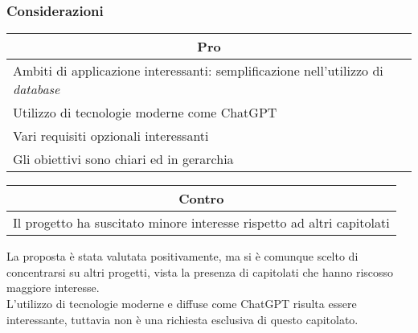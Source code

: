\subsubsection{Considerazioni}
\begin{minipage}[t]{0.45\linewidth}
    \vspace{0pt}
    {\renewcommand{\arraystretch}{1.5}
    \begin{tabular}{p{1\linewidth}}
        \multicolumn{1}{c}{\textbf{Pro}} \\
        \midrule
        Ambiti di applicazione interessanti: semplificazione nell'utilizzo di \textit{database}\\
        Utilizzo di tecnologie moderne come ChatGPT \\
        Vari requisiti opzionali interessanti \\
        Gli obiettivi sono chiari ed in gerarchia \\
        \hline
    \end{tabular}
    }
\end{minipage}
\hspace{0.05\linewidth}
\begin{minipage}[t]{0.45\linewidth}
    \vspace{0pt}
    {\renewcommand{\arraystretch}{1.5}
    \begin{tabular}{p{1\linewidth}}
        \multicolumn{1}{c}{\textbf{Contro}} \\
        \midrule
        Il progetto ha suscitato minore interesse rispetto ad altri capitolati \\
        \hline
    \end{tabular}
    }
\end{minipage}
\vspace{1em}

\noindent
La proposta è stata valutata positivamente, ma si è comunque scelto di concentrarsi su altri progetti, vista la presenza di capitolati che hanno riscosso maggiore interesse.\\
L'utilizzo di tecnologie moderne e diffuse come ChatGPT risulta essere interessante, tuttavia non è una richiesta esclusiva di questo capitolato.